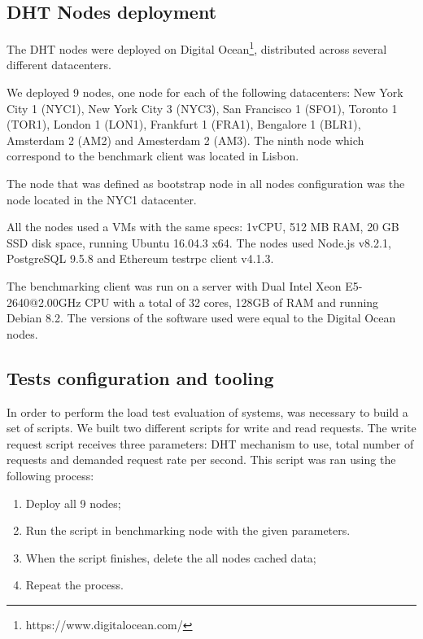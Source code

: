 
\subsection{DHT Nodes deployment}

The DHT nodes were deployed on Digital Ocean\footnote{https://www.digitalocean.com/}, distributed across several different datacenters.

We deployed 9 nodes, one node for each of the following datacenters: New York City 1 (NYC1), New York City 3 (NYC3), San Francisco 1 (SFO1), Toronto 1 (TOR1), London 1 (LON1), Frankfurt 1 (FRA1), Bengalore 1 (BLR1), Amsterdam 2 (AM2) and Amesterdam 2 (AM3).
The ninth node which correspond to the benchmark client was located in Lisbon.

The node that was defined as bootstrap node in all nodes configuration was the node located in the NYC1 datacenter.

All the nodes used a \acp{VM} with the same specs: 1vCPU, 512 MB RAM, 20 GB SSD disk space, running Ubuntu 16.04.3 x64.
The nodes used Node.js v8.2.1, PostgreSQL 9.5.8 and Ethereum testrpc client v4.1.3.

The benchmarking client was run on a server with Dual Intel Xeon E5-2640@2.00GHz CPU with a total of 32 cores, 128GB of RAM and running Debian 8.2.
The versions of the software used were equal to the Digital Ocean nodes.

\subsection{Tests configuration and tooling}

In order to perform the load test evaluation of systems, was necessary to build a set of scripts.
We built two different scripts for write and read requests.
The write request script receives three parameters: DHT mechanism to use, total number of requests and demanded request rate per second.
This script was ran using the following process:

\begin{enumerate}
  \item Deploy all 9 nodes;
  \item Run the script in benchmarking node with the given parameters.
  \item When the script finishes, delete the all nodes cached data;
  \item Repeat the process.
\end{enumerate}

